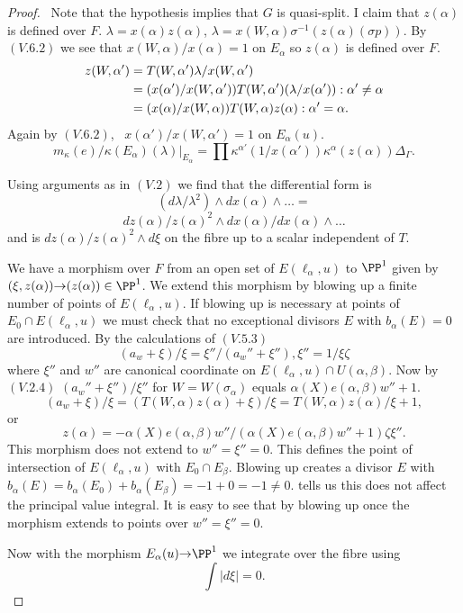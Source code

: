 \documentclass{memo-l}
\theoremstyle{definition}
\theoremstyle{remark}
\numberwithin{section}{chapter}
\numberwithin{equation}{chapter}
\begin{document}
\begin{proof} \ Note that the hypothesis implies that $G$ is
quasi-split.  I claim that $z({\alpha})$ is defined over $F$.  ${\lambda}  =
x({\alpha})z({\alpha})$, ${\lambda}  =
x(W,{\alpha}){\sigma}^{-1}(z({\alpha})({\sigma}p))$.
By $(V.6.2)$ we see that $x(W,{\alpha})/x({\alpha})  =  1$ on $E_{{\alpha}}$
so $z({\alpha})$ is defined over $F$.
$$
\aligned
z(W,{\alpha}')  &= T(W,{\alpha}'){\lambda}/x(W,{\alpha}')  \\
		&= (x({\alpha}')/x(W,{\alpha}'))T(W,{\alpha}')({\lambda}/x({\alpha}')) :
{\alpha}' \ne {\alpha} \\
		&= (x({\alpha})/x(W,{\alpha}))T(W,{\alpha})z({\alpha}) :
{\alpha}' = {\alpha} .
\endaligned
$$
Again by $(V.6.2)$, \ $x({\alpha}')/x(W,{\alpha}')  =  1$ on $E_{{\alpha}}(u)$.
$$
m_{{\kappa}}(e)/{\kappa}(E_{{\alpha}})({\lambda})\vert _{E_\alpha}  =
\prod{\kappa}^{{\alpha}'}(1/x({\alpha}')){\kappa}^{{\alpha}}(z({\alpha})){\Delta}_{{\Gamma}}.
$$

   Using arguments as in $(V.2)$ we find that the differential form is
$$
(d{\lambda}/{\lambda}^{2})\wedge dx({\alpha})\wedge \ldots  =
$$
$$
dz({\alpha})/z({\alpha})^{2}\wedge dx({\alpha})/dx({\alpha})\wedge\ldots
$$
and is $dz({\alpha})/z({\alpha})^{2}\wedge d{\xi}$ on the fibre up to a
scalar independent of $T$.

   We have a morphism over $F$ from an open set of $E({\ell}_{{\alpha}},u)$
to ${\PP}^{1}$ given by $({\xi},z({\alpha})) {\to} (z({\alpha}))  \in
{\PP}^{1}$.  We extend this morphism by blowing up a finite number of
points of $E({\ell}_{{\alpha}},u)$.  If blowing up is necessary at points
of $E_{0}  \cap  E({\ell}_{{\alpha}},u)$ we must check that no exceptional
divisors $E$ with $b_{{\alpha}}(E) = 0$ are introduced.  By the calculations
of $(V.5.3)$ $$(a_{w}+{\xi})/{\xi}  =  {\xi}''/(a_{w}''+{\xi}''), {\xi}''  =
1/{\xi}{\zeta}$$ where ${\xi}''$ and $w''$ are canonical coordinate on
$E({\ell}_{{\alpha}},u)  \cap  U({\alpha},{\beta})$.  Now by $(V.2.4)$
$(a_{w}''+{\xi}'')/{\xi}''$ for $W = W({\sigma}_{{\alpha}})$ equals
${\alpha}(X)e({\alpha},{\beta})w''+1$.  $$(a_{w}+{\xi})/{\xi}  =
(T(W,{\alpha})z({\alpha}) + {\xi})/{\xi}  =  T(W,{\alpha})z({\alpha})/{\xi} +
1,$$ or
$$
z({\alpha})  =
-{\alpha}(X)e({\alpha},{\beta})w''/({\alpha}(X)e({\alpha},{\beta})w''+1){\zeta}{\xi}''.
$$
This morphism does not extend to $w''  =  {\xi}''  =  0$.  This defines the point
of intersection of $E({\ell}_{{\alpha}},u)$ with $E_{0}  \cap
E_{{\beta}}$.  Blowing up creates a divisor $E$ with $b_{{\alpha}}(E)  =
b_{{\alpha}}(E_{0})+b_{{\alpha}}(E_{{\beta}})  =  -1+0  =  -1  \ne 0$.
\cite{MR748510} tells us this does not affect the principal value integral.  It
is easy to see that by blowing up once the morphism extends to points over
$w'' =  {\xi}'' = 0$.

   Now with the morphism $E_{{\alpha}}(u) {\to} {\PP}^{1}$ we integrate
over the fibre using \cite{MR748510}
$$
\int \vert d{\xi}\vert  =  0.
$$
\end{proof}
\end{document}
